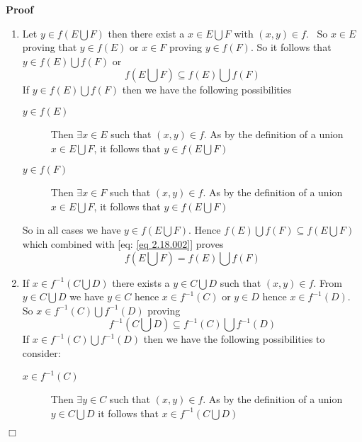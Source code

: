 \documentclass{book}
\newenvironment{proof}{\noindent\textbf{Proof\ }}{\hspace*{\fill}$\Box$\medskip}
\begin{document}
\begin{proof}
  
  \begin{enumerate}
    \item Let $y \in f \left( E \bigcup F \right)$ then there exist a $x \in E
    \bigcup F$ with $(x, y) \in f$. \ So $x \in E$ proving that $y \in f (E)$
    or $x \in F$ proving $y \in f (F)$. So it follows that $y \in f (E)
    \bigcup f (F)$ or
    \begin{equation}
      \label{eq 2.18.002} f \left( E \bigcup F \right) \subseteq f (E) \bigcup
      f (F)
    \end{equation}
    If $y \in f (E) \bigcup f (F)$ then we have the following possibilities
    \begin{description}
      \item[$y \in f (E)$] Then $\exists x \in E$ such that $(x, y) \in f$. As
      by the definition of a union $x \in E \bigcup F$, it follows that $y \in
      f \left( E \bigcup F \right)$
      
      \item[$y \in f (F)$] Then $\exists x \in F$ such that $(x, y) \in f$. As
      by the definition of a union $x \in E \bigcup F$, it follows that $y \in
      f \left( E \bigcup F \right)$
    \end{description}
    So in all cases we have $y \in f \left( E \bigcup F \right)$. Hence $f (E)
    \bigcup f (F) \subseteq f \left( E \bigcup F \right)$ which combined with
    [eq: \ref{eq 2.18.002}] proves
    \[ f \left( E \bigcup F \right) = f (E) \bigcup f (F) \]
    \item If $x \in f^{- 1} \left( C \bigcup D \right)$ there exists a $y \in
    C \bigcup D$ such that $(x, y) \in f$. From $y \in C \bigcup D$ we have $y
    \in C$ hence $x \in f^{- 1} (C)$ or $y \in D$ hence $x \in f^{- 1} (D)$.
    So $x \in f^{- 1} (C) \bigcup f^{- 1} (D)$ proving
    \begin{equation}
      \label{eq 2.19.002} f^{- 1} \left( C \bigcup D \right) \subseteq f^{- 1}
      (C) \bigcup f^{- 1} (D)
    \end{equation}
    If $x \in f^{- 1} (C) \bigcup f^{- 1} (D)$ then we have the following
    possibilities to consider:
    \begin{description}
      \item[$x \in f^{- 1} (C)$] Then $\exists y \in C$ such that $(x, y) \in
      f$. As by the definition of a union $y \in C \bigcup D$ it follows that
      $x \in f^{- 1} \left( C \bigcup D \right)$
      

\end{description}
\end{enumerate}
\end{proof}
\end{document}
